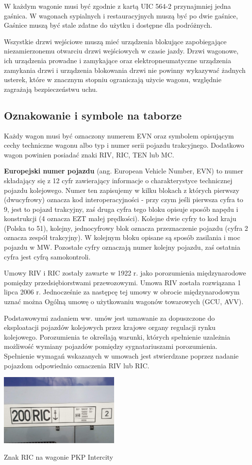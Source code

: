 W każdym wagonie musi być zgodnie z kartą UIC 564-2 przynajmniej jedna gaśnica. W wagonach sypialnych i restauracyjnych muszą być po dwie gaśnice,
Gaśnice muszą być stale zdatne do użytku i dostępne dla podróżnych. 

Wszystkie drzwi wejściowe muszą mieć urządzenia blokujące zapobiegające niezamierzonemu otwarciu drzwi wejściowych w czasie jazdy. Drzwi wagonowe, ich urządzenia prowadne i zamykające oraz elektropneumatyczne urządzenia zamykania drzwi i urządzenia blokowania drzwi nie powinny wykazywać żadnych usterek, które w znacznym stopniu ograniczają użycie wagonu, względnie zagrażają bezpieczeństwu uchu.

\subsection{Oznakowanie i symbole na taborze}

Każdy wagon musi być oznaczony numerem EVN oraz symbolem opisującym cechy techniczne wagonu albo typ i numer serii pojazdu trakcyjnego. Dodatkowo wagon powinien posiadać znaki RIV, RIC, TEN lub MC.

\textbf{Europejski numer pojazdu} (ang. European Vehicle Number, EVN) to numer składający się z 12 cyfr zawierający informacje o charakterystyce technicznej pojazdu kolejowego. 
Numer ten zapisujemy w kilku blokach z których pierwszy (dwucyfrowy) oznacza kod interoperacyjności - przy czym jeśli pierwsza cyfra to 9, jest to pojazd trakcyjny, zaś druga cyfra tego bloku opisuje sposób napędu i konstrukcji (4 oznacza EZT małej prędkości). Kolejne dwie cyfry to kod kraju (Polska to 51), kolejny, jednocyfrowy blok oznacza przeznaczenie pojazdu (cyfra 2 oznacza zespół trakcyjny). W kolejnym bloku opisane są sposób zasilania i moc pojazdu w MW. Pozostałe cyfry oznaczają numer kolejny pojazdu, zaś ostatnia cyfra jest cyfrą samokontroli.

Umowy RIV i RIC zostały zawarte w 1922 r. jako porozumienia międzynarodowe pomiędzy przedsiębiorstwami przewozowymi. Umowa RIV została rozwiązana 1 lipca 2006 r. Jednocześnie za  następcę tej umowy w obrocie międzynarodowym uznać można Ogólną umowę o użytkowaniu wagonów towarowych (GCU, AVV).

Podstawowymi zadaniem ww. umów jest uznawanie za dopuszczone do eksploatacji pojazdów kolejowych przez krajowe organy regulacji rynku kolejowego. Porozumienia te określają warunki, których spełnienie uzależnia możliwość wymiany pojazdów pomiędzy sygnatariuszami porozumienia. Spełnienie wymagań wskazanych w umowach jest stwierdzane poprzez nadanie pojazdom odpowiednio oznaczenia RIV lub RIC.
\begin{marginfigure}
	\includegraphics[width=6cm]{skryptkierownik-img/znak-ric.jpg}
	\caption{Znak RIC na wagonie PKP Intercity}
	\label{fig:pantograf2}
\end{marginfigure}

